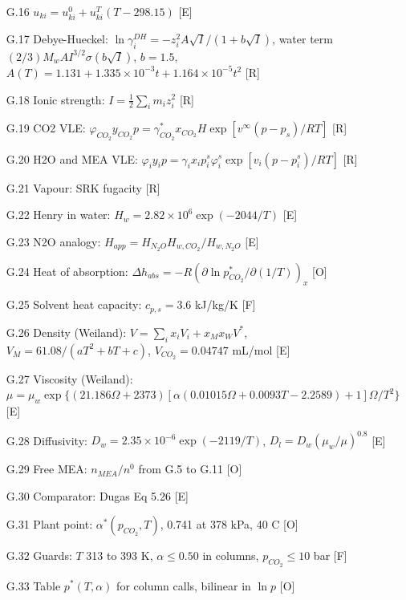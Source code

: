 \begin{enumerate}[leftmargin=1.4cm,itemsep=0pt,topsep=2pt,parsep=0pt]
\item[G.16] $u_{ki}=u^0_{ki}+u^T_{ki}(T-298.15)$ {\footnotesize [E]}
\item[G.17] Debye-Hueckel: $\ln\gamma_i^{DH}=-z_i^2A\sqrt I/(1+b\sqrt I)$, water term $(2/3)M_wAI^{3/2}\sigma(b\sqrt I)$, $b=1.5$, $A(T)=1.131+1.335\times10^{-3}t+1.164\times10^{-5}t^2$ {\footnotesize [R]}
\item[G.18] Ionic strength: $I=\tfrac12\sum_im_iz_i^2$ {\footnotesize [R]}
\item[G.19] CO2 VLE: $\varphi_{CO_2}y_{CO_2}p=\gamma^*_{CO_2}x_{CO_2}H\exp[v^\infty(p-p_s)/RT]$ {\footnotesize [R]}
\item[G.20] H2O and MEA VLE: $\varphi_iy_ip=\gamma_ix_ip_i^s\varphi_i^s\exp[v_i(p-p_i^s)/RT]$ {\footnotesize [R]}
\item[G.21] Vapour: SRK fugacity {\footnotesize [R]}
\item[G.22] Henry in water: $H_w=2.82\times10^6\exp(-2044/T)$ {\footnotesize [E]}
\item[G.23] N2O analogy: $H_{app}=H_{N_2O}H_{w,CO_2}/H_{w,N_2O}$ {\footnotesize [E]}
\item[G.24] Heat of absorption: $\Delta h_{abs}=-R(\partial\ln p^*_{CO_2}/\partial(1/T))_x$ {\footnotesize [O]}
\item[G.25] Solvent heat capacity: $c_{p,s}=3.6$ kJ/kg/K {\footnotesize [F]}
\item[G.26] Density (Weiland): $V=\sum_ix_iV_i+x_Mx_WV^*$, $V_M=61.08/(aT^2+bT+c)$, $V_{CO_2}=0.04747$ mL/mol {\footnotesize [E]}
\item[G.27] Viscosity (Weiland): $\mu=\mu_w\exp\{(21.186\Omega+2373)[\alpha(0.01015\Omega+0.0093T-2.2589)+1]\Omega/T^2\}$ {\footnotesize [E]}
\item[G.28] Diffusivity: $D_w=2.35\times10^{-6}\exp(-2119/T)$, $D_l=D_w(\mu_w/\mu)^{0.8}$ {\footnotesize [E]}
\item[G.29] Free MEA: $n_{MEA}/n^0$ from G.5 to G.11 {\footnotesize [O]}
\item[G.30] Comparator: Dugas Eq 5.26 {\footnotesize [E]}
\item[G.31] Plant point: $\alpha^*(p_{CO_2},T)$, 0.741 at 378 kPa, 40 C {\footnotesize [O]}
\item[G.32] Guards: $T$ 313 to 393 K, $\alpha\le0.50$ in columns, $p_{CO_2}\le10$ bar {\footnotesize [F]}
\item[G.33] Table $p^*(T,\alpha)$ for column calls, bilinear in $\ln p$ {\footnotesize [O]}
\end{enumerate}
